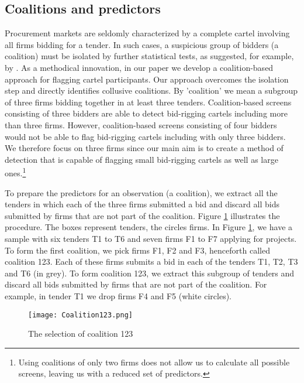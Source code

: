 \documentclass[a4paper,11pt]{article}
\begin{document}
	
	\subsection{Coalitions and predictors}
	
	Procurement markets are seldomly characterized by a complete cartel involving all firms bidding for a tender. In such cases, a suspicious group of bidders (a coalition) must be isolated by further statistical tests, as suggested, for example, by \cite{imhof2018screening}. As a methodical innovation, in our paper we develop a coalition-based approach for flagging cartel participants. Our approach overcomes the isolation step and directly identifies collusive coalitions. By 'coalition' we mean a subgroup of three firms bidding together in at least three tenders. Coalition-based screens consisting of three bidders are able to detect bid-rigging cartels including more than three firms. However, coalition-based screens consisting of four bidders would not be able to flag bid-rigging cartels including with only three bidders. We therefore focus on three firms since our main aim is to create a method of detection that is capable of flagging small bid-rigging cartels as well as large ones.\footnote{Using coalitions of only two firms does not allow us to calculate all possible screens, leaving us with a reduced set of predictors.} 
	
	To prepare the predictors for an observation (a coalition), we extract all the tenders in which each of the three firms submitted a bid and discard all bids submitted by firms that are not part of the coalition. Figure \ref{Coalition123} illustrates the procedure. The boxes represent tenders, the circles firms. In Figure \ref{Coalition123}, we have a sample with six tenders T1 to T6 and seven firms F1 to F7 applying for projects. To form the first coalition, we pick firms F1, F2 and F3, henceforth called coalition 123. Each of these firms submits a bid in each of the tenders T1, T2, T3 and T6 (in grey). To form coalition 123, we extract this subgroup of tenders and discard all bids submitted by firms that are not part of the coalition. For example, in tender T1 we drop firms F4 and F5 (white circles). 
	
	
	\begin{figure}[!htp]
		\centering \caption{\label{Coalition123} The selection of coalition 123}
		\texttt{[image: Coalition123.png]}
	\end{figure}
	
\end{document}
